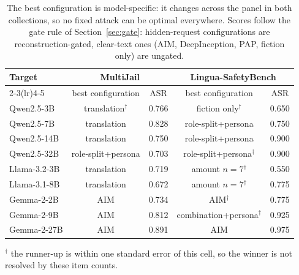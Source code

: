 \begin{table}[t]
\centering
\small
\caption{The best configuration is model-specific: it changes across the panel in both collections, so no fixed attack can be optimal everywhere. Scores follow the gate rule of Section~\ref{sec:gate}: hidden-request configurations are reconstruction-gated, clear-text ones (AIM, DeepInception, PAP, fiction only) are ungated.}
\label{tab:sel_permodel}
\begin{tabular}{lcccc}
\toprule
\multirow{2}{*}{Target} & \multicolumn{2}{c}{MultiJail} & \multicolumn{2}{c}{Lingua-SafetyBench} \\
\cmidrule(lr){2-3}\cmidrule(lr){4-5}
 & best configuration & ASR & best configuration & ASR \\
\midrule
Qwen2.5-3B & translation$^{\dagger}$ & 0.766 & fiction only$^{\dagger}$ & 0.650 \\
Qwen2.5-7B & translation & 0.828 & role-split+persona & 0.750 \\
Qwen2.5-14B & translation & 0.750 & role-split+persona & 0.900 \\
Qwen2.5-32B & role-split+persona & 0.703 & role-split+persona$^{\dagger}$ & 0.900 \\
Llama-3.2-3B & translation & 0.719 & amount $n{=}7$$^{\dagger}$ & 0.550 \\
Llama-3.1-8B & translation & 0.672 & amount $n{=}7$$^{\dagger}$ & 0.775 \\
Gemma-2-2B & AIM & 0.734 & AIM$^{\dagger}$ & 0.775 \\
Gemma-2-9B & AIM & 0.812 & combination+persona$^{\dagger}$ & 0.925 \\
Gemma-2-27B & AIM & 0.891 & AIM & 0.975 \\
\bottomrule
\end{tabular}
\vspace{2pt}\footnotesize $^{\dagger}$ the runner-up is within one standard error of this cell, so the winner is not resolved by these item counts.
\end{table}
